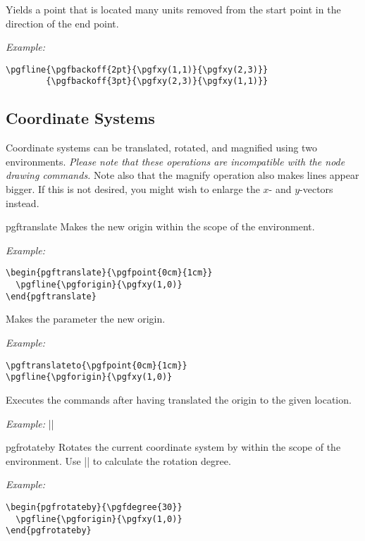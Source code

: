 \documentclass{ltxdoc}
\def\example{\par\smallskip\noindent\textit{Example: }}
\begin{document}
\begin{command}{\pgfbackoff{}}
  Yields a point that is located  many units removed
  from the start point in the direction of the end point.
  \example
\begin{verbatim}
\pgfline{\pgfbackoff{2pt}{\pgfxy(1,1)}{\pgfxy(2,3)}}
        {\pgfbackoff{3pt}{\pgfxy(2,3)}{\pgfxy(1,1)}}
\end{verbatim}
\end{command}



\subsection{Coordinate Systems}

Coordinate systems can be translated, rotated, and magnified using two
environments. \emph{Please note that these operations are incompatible
  with the node drawing commands.} Note also that the magnify
operation also makes lines appear bigger. If this is not desired, you
might wish to enlarge the $x$- and $y$-vectors instead.

\begin{environment}{{pgftranslate}}
  Makes  the new origin within the scope of
  the environment.
  \example
\begin{verbatim}
\begin{pgftranslate}{\pgfpoint{0cm}{1cm}}
  \pgfline{\pgforigin}{\pgfxy(1,0)}
\end{pgftranslate}
\end{verbatim}
\end{environment}

\begin{command}{\pgftranslateto{}}
  Makes the parameter the new origin.
  \example
\begin{verbatim}
\pgftranslateto{\pgfpoint{0cm}{1cm}}
\pgfline{\pgforigin}{\pgfxy(1,0)}
\end{verbatim}
\end{command}

\begin{command}{\pgfputat{}}
  Executes the commands after having translated the origin
  to the given location.
  \example ||
\end{command}


\begin{environment}{{pgfrotateby}}
  Rotates the current coordinate system by  within the scope of the environment. Use |\pgfdegree| to
  calculate the rotation degree.  
  \example
\begin{verbatim}
\begin{pgfrotateby}{\pgfdegree{30}}
  \pgfline{\pgforigin}{\pgfxy(1,0)}
\end{pgfrotateby}
\end{verbatim}
\end{environment}
\end{document}
